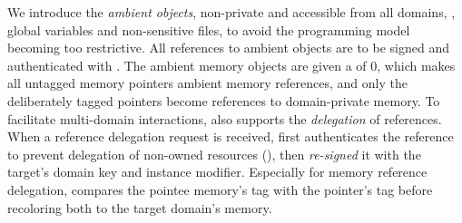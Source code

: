 We introduce the \emph{ambient objects}, non-private and accessible from all domains, \eg, global variables and non-sensitive files, to avoid the programming model becoming too restrictive.
All references to ambient objects are to be signed and authenticated with .
The ambient memory objects are given a  of $0$, which makes all untagged memory pointers ambient memory references, and only the deliberately tagged pointers become references to domain-private memory.
To facilitate multi-domain interactions, \thename also supports the \emph{delegation} of references.
When a reference delegation request is received, \thename first authenticates the reference to prevent delegation of non-owned resources (\srimper), then \emph{re-signed} it with the target's domain key and instance modifier.
Especially for memory reference delegation, \thename compares the pointee memory's tag with the pointer's tag before recoloring both to the target domain's memory.

\begin{listing}[t]
	
	\caption{Example of \thename's programming model, annotated with \thename references and their enforcement.}
	\label{fig:code-example}
\end{listing}

